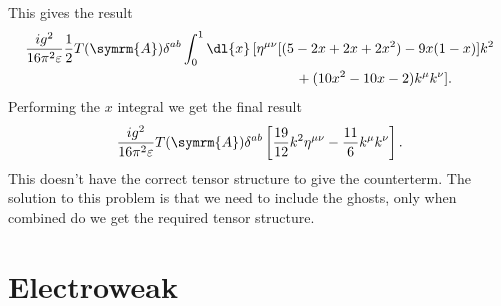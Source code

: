 \documentclass[fleqn]{NotesClass}
\newcommand{\amplitude}{\symcal{A}}
\newcommand{\minkowskiMetric}{\eta}
\newcommand{\adjointRep}{\symrm{A}}
\begin{document}
    This gives the result
    \begin{align}
        \frac{ig^2}{16\pi^2\varepsilon} \frac{1}{2}T(\adjointRep)\delta^{ab} \int_0^1 \dl{x} \, [ \minkowskiMetric^{\mu\nu}[&(5 - 2x + 2x + 2x^2) - 9x(1 - x)]k^2 \notag\\
        &\quad+ (10x^2 - 10x - 2)k^\mu k^\nu ].
    \end{align}
    Performing the \(x\) integral we get the final result
    \begin{equation}
        \frac{ig^2}{16\pi^2\varepsilon} T(\adjointRep)\delta^{ab}\left[ \frac{19}{12}k^2\minkowskiMetric^{\mu\nu} - \frac{11}{6} k^\mu k^\nu \right].
    \end{equation}
    This doesn't have the correct tensor structure to give the counterterm.
    The solution to this problem is that we need to include the ghosts, only when combined do we get the required tensor structure.
    
    
    
    
    
    
    
    
    
    \renewcommand{\amplitude}{\symcal{M}}    
    
    
    
    
    
    
    
    
    
    
    
    
    
    
    
    \part{Electroweak}
\end{document}
